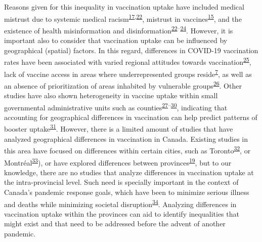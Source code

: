 \documentclass[
]{article}
\begin{document}
Reasons given for this inequality in vaccination uptake have included
medical mistrust due to systemic medical
racism\textsuperscript{\protect\hyperlink{ref-stoler2021}{17},\protect\hyperlink{ref-mosby2021}{22}},
mistrust in
vaccines\textsuperscript{\protect\hyperlink{ref-willis2021}{15}}, and
the existence of health misinformation and
disinformation\textsuperscript{\protect\hyperlink{ref-mosby2021}{22}--\protect\hyperlink{ref-freeman2020}{24}}.
However, it is important also to consider that vaccination uptake can be
influenced by geographical (spatial) factors. In this regard,
differences in COVID-19 vaccination rates have been associated with
varied regional attitudes towards
vaccination\textsuperscript{\protect\hyperlink{ref-malik2020}{25}}, lack
of vaccine access in areas where underrepresented groups
reside\textsuperscript{\protect\hyperlink{ref-bogoch2022}{7}}, as well
as an absence of prioritization of areas inhabited by vulnerable
groups\textsuperscript{\protect\hyperlink{ref-nguyen2021}{26}}. Other
studies have also shown heterogeneity in vaccine uptake within small
governmental administrative units such as
counties\textsuperscript{\protect\hyperlink{ref-mollalo2021}{27}--\protect\hyperlink{ref-bhuiyan2022}{30}},
indicating that accounting for geographical differences in vaccination
can help predict patterns of booster
uptake\textsuperscript{\protect\hyperlink{ref-wood2022}{31}}. However,
there is a limited amount of studies that have analyzed geographical
differences in vaccination in Canada. Existing studies in this area have
focused on differences within certain cities, such as
Toronto\textsuperscript{\protect\hyperlink{ref-choi2021}{32}}, or
Montréal\textsuperscript{\protect\hyperlink{ref-mckinnon2021}{33}}), or
have explored differences between
provinces\textsuperscript{\protect\hyperlink{ref-guay2022}{19}}, but to
our knowledge, there are no studies that analyze differences in
vaccination uptake at the intra-provincial level. Such need is specially
important in the context of Canada's pandemic response goals, which have
been to minimize serious illness and deaths while minimizing societal
disruption\textsuperscript{\protect\hyperlink{ref-naci2023}{34}}.
Analyzing differences in vaccination uptake within the provinces can aid
to identify inequalities that might exist and that need to be addressed
before the advent of another pandemic.
\end{document}
